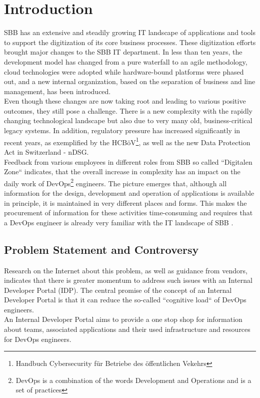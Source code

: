 \documentclass[a4paper,12pt]{article}
\begin{document}
    \pagebreak



    \section{Introduction}
    \label{sec:introduction}
    SBB has an extensive and steadily growing IT landscape of applications and tools to support the digitization of its
    core business processes.
    These digitization efforts brought major changes to the SBB IT department.
    In less than ten years, the development model has changed from a pure waterfall to an agile methodology,
    cloud technologies were adopted while hardware-bound platforms were phased out, and a new internal organization,
    based on the separation of business and line management, has been introduced.\\
    Even though these changes are now taking root and leading to various positive outcomes, they still pose a challenge.
    There is a new complexity with the rapidly changing technological landscape but also due to very many old,
    business-critical legacy systems.
    In addition, regulatory pressure has increased significantly in recent years, as exemplified by the
    HCBöV\footnote{Handbuch Cybersecurity für Betriebe des öffentlichen Vekehrs}, as well as the new Data Protection Act in Switzerland - nDSG.\\
    Feedback from various employees in different roles from SBB so called ``Digitalen Zone`` indicates, that the overall
    increase in complexity has an impact on the daily work of DevOps\footnote{DevOps is a combination of the words
    Development and Operations and is a set of practices} engineers.
    The picture emerges that, although all information for the design, development and operation of
    applications is available in principle, it is maintained in very different places and forms.
    This makes the procurement of information for these activities time-consuming and requires that a DevOps
    engineer is already very familiar with the IT landscape of SBB .

    \subsection{Problem Statement and Controversy}
    \label{subsec:iproblemstatement}
    Research on the Internet about this problem, as well as guidance from vendors, indicates that there is greater momentum
    to address such issues with an Internal Developer Portal (IDP).
    The central promise of the concept of an Internal Developer Portal is that it can reduce the so-called
    ``cognitive load`` of DevOps engineers.\\
    An Internal Developer Portal aims to provide a one stop shop for information about teams, associated applications and
    their used infrastructure and resources for DevOps engineers.
\end{document}
